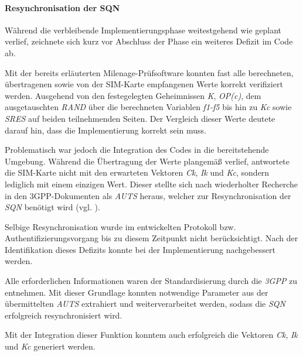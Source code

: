 		\paragraph{Resynchronisation der SQN} Während die verbleibende
		Implementierungsphase weitestgehend wie geplant verlief, zeichnete
		sich kurz vor Abschluss der Phase ein weiteres Defizit im Code ab.

		Mit der bereits erläuterten Milenage-Prüfsoftware konnten fast
		alle berechneten, übertragenen sowie von der SIM-Karte empfangenen
		Werte korrekt verifiziert werden. Ausgehend von den festegelegten
		Geheimnissen \textit{K}, \textit{OP(c)}, dem ausgetauschten \textit{RAND}
		über die berechneten Variablen \textit{f1-f5} bis hin zu \textit{Kc} sowie
		\textit{SRES} auf beiden teilnehmenden Seiten.
		Der Vergleich dieser Werte deutete darauf hin, dass die Implementierung
		korrekt sein muss.

		Problematisch war jedoch die Integration des Codes in die bereitstehende
		Umgebung. Während die Übertragung der Werte plangemäß verlief, antwortete
		die SIM-Karte nicht mit den erwarteten Vektoren \textit{Ck}, \textit{Ik}
		und \textit{Kc}, sondern lediglich mit einem einzigen Wert. Dieser
		stellte sich nach wiederholter Recherche in den 3GPP-Dokumenten als
		\textit{AUTS} heraus, welcher zur Resynchronisation der \textit{SQN}
		benötigt wird (vgl. ).

		Selbige Resynchronisation wurde im entwickelten
		Protokoll bzw. Authentifizierungsvorgang bis zu diesem Zeitpunkt
		nicht berücksichtigt. Nach der Identifikation dieses Defizits
		konnte bei der Implementierung nachgebessert werden.

		Alle erforderlichen Informationen waren der Standardisierung
		durch die \textit{3GPP} zu entnehmen. Mit dieser Grundlage konnten
		notwendige Parameter aus der übermittelten \textit{AUTS} extrahiert
		und weiterverarbeitet werden, sodass die \textit{SQN} erfolgreich
		resynchronisiert wird. 

		Mit der Integration dieser Funktion konntem auch erfolgreich die
		Vektoren \textit{Ck}, \textit{Ik} und \textit{Kc} generiert werden.

\clearpage